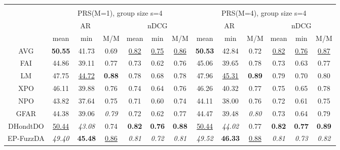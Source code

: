 \begin{tabular}{ c | c c c | c c c || c c c | c c c}
\multicolumn{12}{c}{} \\
\multicolumn{1}{c}{} & \multicolumn{6}{c}{PRS(M=1), group size s=4} & \multicolumn{6}{c}{PRS(M=4), group size s=4} \\
\multicolumn{1}{c}{} & \multicolumn{3}{c}{AR} & \multicolumn{3}{c}{nDCG} & \multicolumn{3}{c}{AR} & \multicolumn{3}{c}{nDCG} \\
& mean & min & M/M & mean & min & M/M & mean & min & M/M & mean & min & M/M \\
\hline
AVG & \textbf{50.55} & 41.73 & 0.69 & \underline{0.82} & \underline{0.75} & \underline{0.86} & \textbf{50.53} & 42.84 & 0.72 & \underline{0.82} & \underline{0.76} & \underline{0.87} \\
FAI & 44.86 & 39.11 & 0.77 & 0.73 & 0.62 & 0.76 & 45.06 & 39.65 & 0.78 & 0.73 & 0.63 & 0.77 \\
LM & 47.75 & \underline{44.72} & \textbf{0.88} & 0.78 & 0.68 & 0.78 & 47.96 & \underline{45.31} & \textbf{0.89} & 0.79 & 0.70 & 0.80 \\
XPO & 46.11 & 39.88 & 0.76 & 0.74 & 0.64 & 0.76 & 46.26 & 40.32 & 0.77 & 0.75 & 0.65 & 0.78 \\
NPO & 43.82 & 37.64 & 0.75 & 0.71 & 0.60 & 0.74 & 44.11 & 38.00 & 0.76 & 0.72 & 0.61 & 0.75 \\
GFAR & 44.38 & 39.06 & \textit{0.79} & 0.72 & 0.62 & 0.77 & 44.47 & 39.48 & \textit{0.80} & 0.73 & 0.64 & 0.79 \\
DHondtDO & \underline{50.44} & \textit{43.08} & 0.74 & \textbf{0.82} & \textbf{0.76} & \textbf{0.88} & \underline{50.44} & \textit{44.02} & 0.77 & \textbf{0.82} & \textbf{0.77} & \textbf{0.89} \\
EP-FuzzDA & \textit{49.40} & \textbf{45.48} & \underline{0.86} & \textit{0.81} & \textit{0.72} & \textit{0.81} & \textit{49.52} & \textbf{46.33} & \underline{0.88} & \textit{0.81} & \textit{0.73} & \textit{0.82} \\


\end{tabular}
